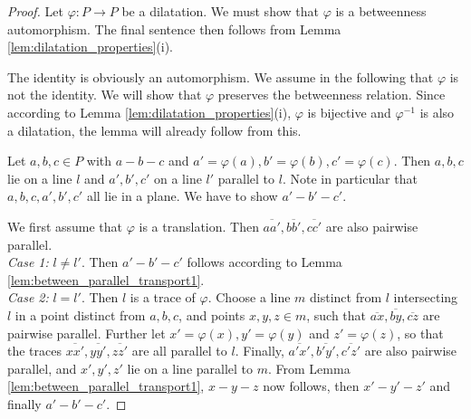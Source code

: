 \documentclass[11pt,a4paper]{article}
\newcommand{\betw}[3]{#1 - #2 - #3}
\newcommand{\lineab}[1]{\overline{#1}}
\begin{document}
\begin{proof}
Let $\varphi: P \to P$ be a dilatation. We must show that $\varphi$ is a betweenness automorphism. The final sentence then follows from Lemma \ref{lem:dilatation_properties}(i).

The identity is obviously an automorphism. We assume in the following that $\varphi$ is not the identity. We will show that $\varphi$ preserves the betweenness relation. Since according to Lemma \ref{lem:dilatation_properties}(i), $\varphi$ is bijective and $\varphi^{-1}$ is also a dilatation, the lemma will already follow from this.

Let $a, b, c \in P$ with $\betw{a}{b}{c}$ and $a' = \varphi(a), b' = \varphi(b), c' = \varphi(c)$. Then $a, b, c$ lie on a line $l$ and $a', b', c'$ on a line $l'$ parallel to $l$. Note in particular that $a, b, c, a', b', c'$ all lie in a plane. We have to show $\betw{a'}{b'}{c'}$.

We first assume that $\varphi$ is a translation. Then $\lineab{aa'}, \lineab{bb'}, \lineab{cc'}$ are also pairwise parallel. \\
\textit{Case 1:} $l \neq l'$. Then $\betw{a'}{b'}{c'}$ follows according to Lemma \ref{lem:between_parallel_transport1}. \\
\textit{Case 2:} $l = l'$. Then $l$ is a trace of $\varphi$. Choose a line $m$ distinct from $l$ intersecting $l$ in a point distinct from $a, b, c$, and points $x, y, z \in m$, such that $\lineab{ax}, \lineab{by}, \lineab{cz}$ are pairwise parallel. Further let $x' = \varphi(x), y' = \varphi(y)$ and $z' = \varphi(z)$, so that the traces $\lineab{xx'}, \lineab{yy'}, \lineab{zz'}$ are all parallel to $l$. Finally, $\lineab{a'x'}, \lineab{b'y'}, \lineab{c'z'}$ are also pairwise parallel, and $x', y', z'$ lie on a line parallel to $m$. From Lemma \ref{lem:between_parallel_transport1}, $\betw{x}{y}{z}$ now follows, then $\betw{x'}{y'}{z'}$ and finally $\betw{a'}{b'}{c'}$.


\end{proof}
\end{document}
